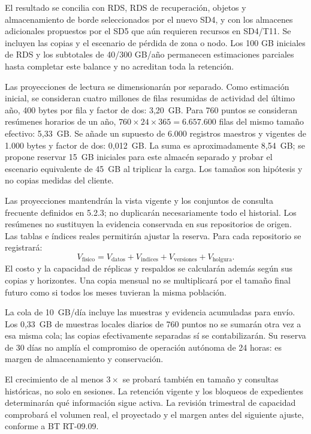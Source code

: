 El resultado se concilia con RDS, RDS de recuperación, objetos y almacenamiento de borde seleccionados por el nuevo SD4, y con los almacenes adicionales propuestos por el SD5 que aún requieren recursos en SD4/T11. Se incluyen las copias y el escenario de pérdida de zona o nodo. Los 100 GB iniciales de RDS y los subtotales de 40/300 GB/año permanecen estimaciones parciales hasta completar este balance y no acreditan toda la retención.

Las proyecciones de lectura se dimensionarán por separado. Como estimación inicial, se consideran cuatro millones de filas resumidas de actividad del último año, 400 bytes por fila y factor de dos: 3,20~GB. Para 760 puntos se consideran resúmenes horarios de un año, \(760\times24\times365=6.657.600\) filas del mismo tamaño efectivo: 5,33~GB. Se añade un supuesto de 6.000 registros maestros y vigentes de 1.000 bytes y factor de dos: 0,012~GB. La suma es aproximadamente 8,54~GB; se propone reservar 15~GB iniciales para este almacén separado y probar el escenario equivalente de 45~GB al triplicar la carga. Los tamaños son hipótesis y no copias medidas del cliente.

Las proyecciones mantendrán la vista vigente y los conjuntos de consulta frecuente definidos en 5.2.3; no duplicarán necesariamente todo el historial. Los resúmenes no sustituyen la evidencia conservada en sus repositorios de origen. Las tablas e índices reales permitirán ajustar la reserva. Para cada repositorio se registrará:
\[
V_{\mathrm{fisico}}=
V_{\mathrm{datos}}+V_{\mathrm{indices}}+
V_{\mathrm{versiones}}+V_{\mathrm{holgura}}.
\]
El costo y la capacidad de réplicas y respaldos se calcularán además según sus copias y horizontes. Una copia mensual no se multiplicará por el tamaño final futuro como si todos los meses tuvieran la misma población.

La cola de 10~GB/día incluye las muestras y evidencia acumuladas para envío. Los 0,33~GB de muestras locales diarios de 760 puntos no se sumarán otra vez a esa misma cola; las copias efectivamente separadas sí se contabilizarán. Su reserva de 30 días no amplía el compromiso de operación autónoma de 24 horas: es margen de almacenamiento y conservación.

El crecimiento de al menos \(3\times\) se probará también en tamaño y consultas históricas, no solo en sesiones. La retención vigente y los bloqueos de expedientes determinarán qué información sigue activa. La revisión trimestral de capacidad comprobará el volumen real, el proyectado y el margen antes del siguiente ajuste, conforme a BT RT-09.09.

